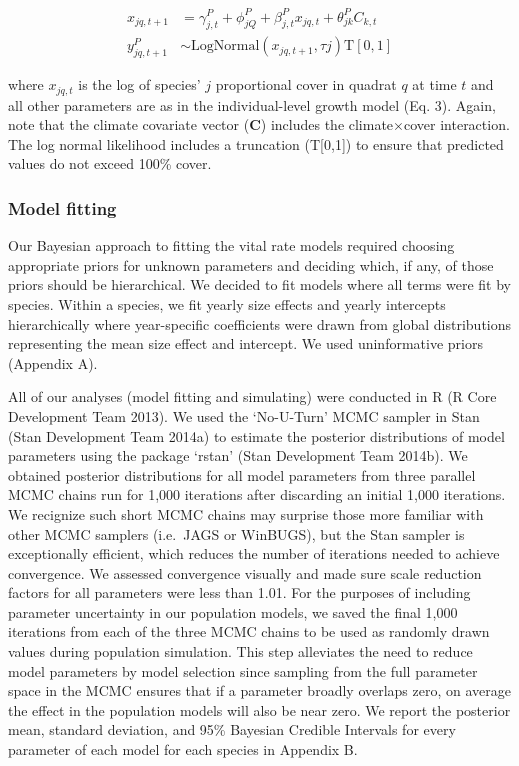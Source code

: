 \documentclass[12pt,]{article}
\begin{document}
\begin{align}
x_{jq,t+1} &= \gamma^{P}_{j,t} + \phi^{P}_{jQ} + \beta^{P}_{j,t}x_{jq,t} + \theta^{P}_{jk}C_{k,t} \\
y^{P}_{jq,t+1} &\sim \text{LogNormal}(x_{jq,t+1}, \tau{j}) \text{T}[0,1]
\end{align}

where $x_{jq,t}$ is the log of species' $j$ proportional cover in
quadrat $q$ at time $t$ and all other parameters are as in the
individual-level growth model (Eq. 3). Again, note that the climate
covariate vector (\textbf{C}) includes the climate$\times$cover
interaction. The log normal likelihood includes a truncation
(T{[}0,1{]}) to ensure that predicted values do not exceed 100\% cover.

\subsubsection{Model fitting}\label{model-fitting}

Our Bayesian approach to fitting the vital rate models required choosing
appropriate priors for unknown parameters and deciding which, if any, of
those priors should be hierarchical. We decided to fit models where all
terms were fit by species. Within a species, we fit yearly size effects
and yearly intercepts hierarchically where year-specific coefficients
were drawn from global distributions representing the mean size effect
and intercept. We used uninformative priors (Appendix A).

All of our analyses (model fitting and simulating) were conducted in R
(R Core Development Team 2013). We used the `No-U-Turn' MCMC sampler in
Stan (Stan Development Team 2014a) to estimate the posterior
distributions of model parameters using the package `rstan' (Stan
Development Team 2014b). We obtained posterior distributions for all
model parameters from three parallel MCMC chains run for 1,000
iterations after discarding an initial 1,000 iterations. We recignize
such short MCMC chains may surprise those more familiar with other MCMC
samplers (i.e.~JAGS or WinBUGS), but the Stan sampler is exceptionally
efficient, which reduces the number of iterations needed to achieve
convergence. We assessed convergence visually and made sure scale
reduction factors for all parameters were less than 1.01. For the
purposes of including parameter uncertainty in our population models, we
saved the final 1,000 iterations from each of the three MCMC chains to
be used as randomly drawn values during population simulation. This step
alleviates the need to reduce model parameters by model selection since
sampling from the full parameter space in the MCMC ensures that if a
parameter broadly overlaps zero, on average the effect in the population
models will also be near zero. We report the posterior mean, standard
deviation, and 95\% Bayesian Credible Intervals for every parameter of
each model for each species in Appendix B.
\end{document}

